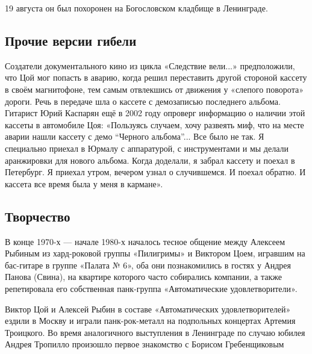 19 августа он был похоронен на Богословском кладбище в Ленинграде.

\subsection{Прочие версии гибели}
Создатели документального кино из цикла «Следствие вели...» предположили, что Цой мог попасть в аварию, когда решил переставить другой стороной кассету в своём магнитофоне, тем самым отвлекшись от движения у «слепого поворота» дороги. Речь в передаче шла о кассете с демозаписью последнего альбома. Гитарист Юрий Каспарян ещё в 2002 году опроверг информацию о наличии этой кассеты в автомобиле Цоя: «Пользуясь случаем, хочу развеять миф, что на месте аварии нашли кассету с демо ``Черного альбома''... Все было не так. Я специально приехал в Юрмалу с аппаратурой, с инструментами и мы делали аранжировки для нового альбома. Когда доделали, я забрал кассету и поехал в Петербург. Я приехал утром, вечером узнал о случившемся. И поехал обратно. И кассета все время была у меня в кармане».


\subsection{Творчество}
В конце 1970-х --- начале 1980-х началось тесное общение между Алексеем Рыбиным из хард-роковой группы «Пилигримы» и Виктором Цоем, игравшим на бас-гитаре в группе «Палата № 6», оба они познакомились в гостях у Андрея Панова (Свина), на квартире которого часто собирались компании, а также репетировала его собственная панк-группа «Автоматические удовлетворители».

Виктор Цой и Алексей Рыбин в составе «Автоматических удовлетворителей» ездили в Москву и играли панк-рок-металл на подпольных концертах Артемия Троицкого. Во время аналогичного выступления в Ленинграде по случаю юбилея Андрея Тропилло произошло первое знакомство с Борисом Гребенщиковым

